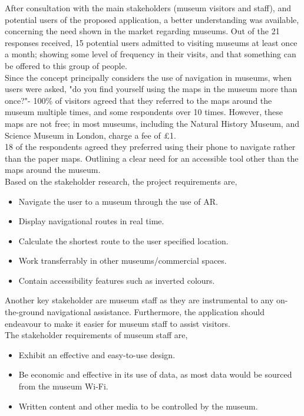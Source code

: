 
After consultation with the main stakeholders (museum visitors and staff), and potential users of the proposed application, a better understanding was available, concerning the need shown in the market regarding museums. Out of the 21 responses received, 15 potential users admitted to visiting museums at least once a month; showing some level of frequency in their visits, and that something can be offered to this group of people.\\

Since the concept principally considers the use of navigation in museums, when users were asked, "do you find yourself using the maps in the museum more than once?"- 100\% of visitors agreed that they referred to the maps around the museum multiple times, and some respondents over 10 times. However, these maps are not free; in most museums, including the Natural History Museum, and Science Museum in London, charge a fee of £1.\\

18 of the respondents agreed they preferred using their phone to navigate rather than the paper maps. Outlining a clear need for an accessible tool other than the maps around the museum.\\

Based on the stakeholder research, the project requirements are, 
\begin{itemize}
    \item Navigate the user to a museum through the use of AR.
    \item Display navigational routes in real time.
    \item Calculate the shortest route to the user specified location.
    \item Work transferrably in other museums/commercial spaces.
    \item Contain accessibility features such as inverted colours.
\end{itemize}

Another key stakeholder are museum staff as they are instrumental to any on-the-ground navigational assistance. Furthermore, the application should endeavour to make it easier for museum staff to assist visitors.\\

The stakeholder requirements of museum staff are,
\begin{itemize}
    \item Exhibit an effective and easy-to-use design. 
    \item Be economic and effective in its use of data, as most data would be sourced from the museum Wi-Fi. 
    \item Written content and other media to be controlled by the museum.
\end{itemize}

